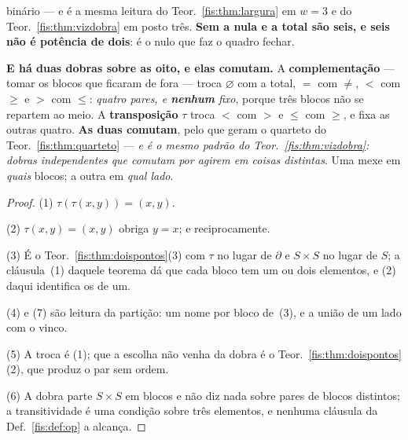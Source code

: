 \documentclass[livro.tex]{subfiles}
\begin{document}
\begin{teorema}
{binário} --- e é a mesma leitura do Teor.~\ref{fis:thm:largura} em $w=3$ e do
Teor.~\ref{fis:thm:vizdobra} em posto três. \textbf{Sem a nula e a total são
seis, e seis não é potência de dois}: é o nulo que faz o quadro fechar.
\item[(9)] \textbf{E há duas dobras sobre as oito, e elas comutam.} A
\textbf{complementação} --- tomar os blocos que ficaram de fora --- troca
$\varnothing$ com a total, $=$ com $\neq$, $<$ com $\ge$ e $>$ com $\le$:
\emph{quatro pares, e \textbf{nenhum} fixo}, porque três blocos não se repartem
ao meio. A \textbf{transposição} $\tau$ troca $<$ com $>$ e $\le$ com $\ge$, e
fixa as outras quatro. \textbf{As duas comutam}, pelo que geram o quarteto do
Teor.~\ref{fis:thm:quarteto} --- \emph{e é o mesmo padrão do
Teor.~\ref{fis:thm:vizdobra}: dobras independentes que comutam por agirem em
coisas distintas}. Uma mexe em \emph{quais} blocos; a outra em \emph{qual lado}.
\end{teorema}

\begin{proof}
(1) $\tau(\tau(x,y))=(x,y)$.

(2) $\tau(x,y)=(x,y)$ obriga $y=x$; e reciprocamente.

(3) É o Teor.~\ref{fis:thm:doispontos}(3) com $\tau$ no lugar de $\partial$ e
$S\times S$ no lugar de $S$; a cláusula~(1) daquele teorema dá que cada bloco tem
um ou dois elementos, e (2) daqui identifica os de um.

(4) e (7) são leitura da partição: um nome por bloco de~(3), e a união de um lado
com o vinco.

(5) A troca é (1); que a escolha não venha da dobra é o
Teor.~\ref{fis:thm:doispontos}(2), que produz o par sem ordem.

(6) A dobra parte $S\times S$ em blocos e não diz nada sobre pares de blocos
distintos; a transitividade é uma condição sobre três elementos, e nenhuma
cláusula da Def.~\ref{fis:def:op} a alcança.
\end{proof}

\end{document}
